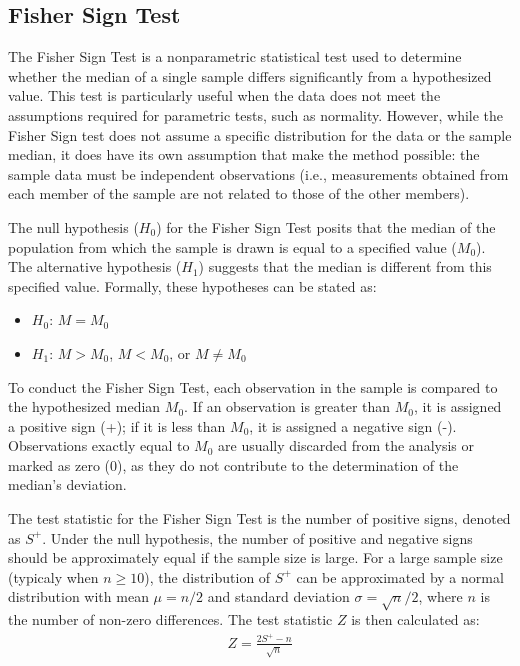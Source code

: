 \documentclass{article}
\begin{document}
\subsection{Fisher Sign Test}

The Fisher Sign Test is a nonparametric statistical test used to determine whether the median of a single sample differs significantly from a hypothesized value. This test is particularly useful when the data does not meet the assumptions required for parametric tests, such as normality. However, while the Fisher Sign test does not assume a specific distribution for the data or the sample median, it does have its own assumption that make the method possible: the sample data must be independent observations (i.e., measurements obtained from each member of the sample are not related to those of the other members).

The null hypothesis ($H_0$) for the Fisher Sign Test posits that the median of the population from which the sample is drawn is equal to a specified value ($M_0$). The alternative hypothesis ($H_1$) suggests that the median is different from this specified value. Formally, these hypotheses can be stated as:

\begin{itemize}
    \item $H_0$: $M = M_0$
    \item $H_1$: $M > M_0$, $M < M_0$, or $M \neq M_0$
\end{itemize}

To conduct the Fisher Sign Test, each observation in the sample is compared to the hypothesized median $M_0$. If an observation is greater than $M_0$, it is assigned a positive sign (+); if it is less than $M_0$, it is assigned a negative sign (-). Observations exactly equal to $M_0$ are usually discarded from the analysis or marked as zero ($0$), as they do not contribute to the determination of the median's deviation.

The test statistic for the Fisher Sign Test is the number of positive signs, denoted as $S^{+}$. Under the null hypothesis, the number of positive and negative signs should be approximately equal if the sample size is large. For a large sample size (typicaly when $n \geq 10$), the distribution of $S^{+}$ can be approximated by a normal distribution with mean $\mu = n/2$ and standard deviation $\sigma = \sqrt{n}/2$, where $n$ is the number of non-zero differences. The test statistic $Z$ is then calculated as:
\begin{align*}
    Z = \frac{2S^{+}-n}{\sqrt{n}}
\end{align*}
\end{document}
